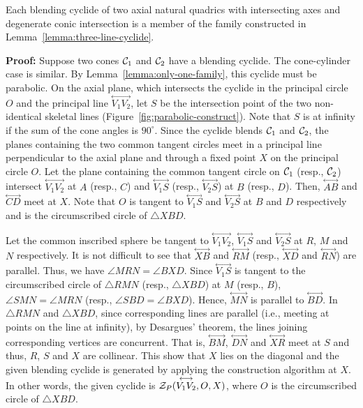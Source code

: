 \begin{lemma}
\label{lemma:1-parabolic}
     Each blending cyclide of two axial natural quadrics with intersecting
axes and degenerate conic intersection is a member of the family constructed
in Lemma~\ref{lemma:three-line-cyclide}.
\end{lemma}
{\bf Proof:} Suppose two cones ${\cal C}_1$ and ${\cal C}_2$ have a blending
cyclide.  The cone-cylinder case is similar.
By Lemma~\ref{lemma:only-one-family}, this cyclide must be
parabolic.  On the axial plane, which intersects the cyclide in the principal
circle $O$ and the principal line $\stackrel{\longleftrightarrow}{V_1V_2}$,
let $S$ be the intersection point of the two non-identical skeletal lines
(Figure~\ref{fig:parabolic-construct}).  Note that $S$ is at infinity if the 
sum of the  cone angles is $90^\circ$.  Since the cyclide blends ${\cal C}_1$ 
and ${\cal C}_2$, the planes containing the two common tangent circles  meet in
a principal line perpendicular to the axial plane and through a fixed point $X$
on the principal circle $O$.  Let the plane containing the
common tangent circle on ${\cal C}_1$ (resp., ${\cal C}_2$) intersect
$\stackrel{\longleftrightarrow}{V_1V_2}$ at $A$ (resp., $C$) and
$\stackrel{\longleftrightarrow}{V_1S}$ (resp.,
$\stackrel{\longleftrightarrow}{V_2S}$) at $B$ (resp., $D$).  Then,
$\stackrel{\longleftrightarrow}{AB}$ and $\stackrel{\longleftrightarrow}{CD}$
meet at $X$.  Note that $O$ is tangent to 
$\stackrel{\longleftrightarrow}{V_1S}$ and 
$\stackrel{\longleftrightarrow}{V_2S}$ at $B$ and $D$ respectively and
is the circumscribed circle of $\bigtriangleup XBD$.

     Let the common inscribed sphere be tangent to
$\stackrel{\longleftrightarrow}{V_1V_2}$,
$\stackrel{\longleftrightarrow}{V_1S}$ and
$\stackrel{\longleftrightarrow}{V_2S}$ at $R$, $M$ and $N$ respectively.
It is not difficult to see that $\stackrel{\longleftrightarrow}{XB}$ and
$\stackrel{\longleftrightarrow}{RM}$ (resp., 
$\stackrel{\longleftrightarrow}{XD}$ and
$\stackrel{\longleftrightarrow}{RN}$) are parallel.  Thus, we have
$\angle MRN=\angle BXD$.  Since 
$\stackrel{\longleftrightarrow}{V_1S}$ is tangent to the circumscribed circle
of $\bigtriangleup RMN$ (resp., $\bigtriangleup XBD$) at $M$ (resp., $B$), 
$\angle SMN=\angle MRN$ (resp., $\angle SBD=\angle BXD$).
Hence, $\stackrel{\longleftrightarrow}{MN}$ is parallel to
$\stackrel{\longleftrightarrow}{BD}$.  In $\bigtriangleup RMN$ and
$\bigtriangleup XBD$, since corresponding lines are parallel (i.e., meeting at
points on the line at infinity), by Desargues' theorem, the lines joining 
corresponding vertices are concurrent.  That is, 
$\stackrel{\longleftrightarrow}{BM}$,
$\stackrel{\longleftrightarrow}{DN}$ and
$\stackrel{\longleftrightarrow}{XR}$ meet at $S$ and thus, $R$, $S$ and $X$ are
collinear.  This show that $X$ lies on the diagonal and the given blending
cyclide is generated by applying the construction algorithm at $X$.
In other words, the given cyclide is 
${\cal Z}_P(\stackrel{\longleftrightarrow}{V_1V_2},O,X)$, where $O$ is the
circumscribed circle of $\bigtriangleup XBD$.  \QED


